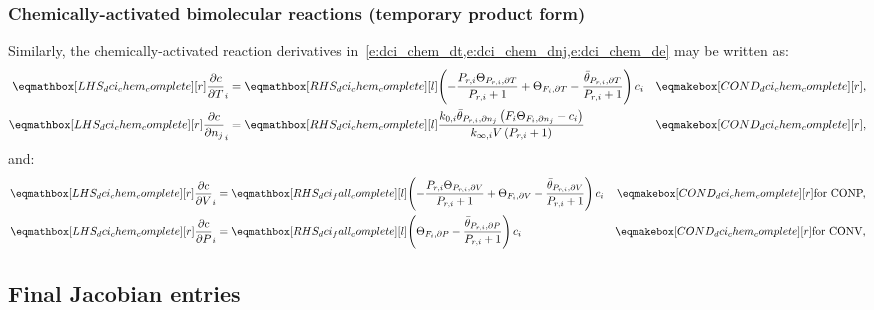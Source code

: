\documentclass[12pt]{article}
\newcommand{\conp}{CONP}
\newcommand{\conv}{CONV}
\newcommand{\dconp}{\ifmmode\text{for \conp,}\else for \conp,\fi}
\newcommand{\dconv}{\ifmmode\text{for \conv,}\else for \conv,\fi}
\begin{document}
\subsubsection{Chemically-activated bimolecular reactions (temporary product form)}
Similarly, the chemically-activated reaction derivatives in~\cref{e:dci_chem_dt,e:dci_chem_dnj,e:dci_chem_de} may be written as:
\begin{align}
\lhs{dci_chem_complete}{\frac{\partial c }{\partial T }_{i}} &= \rhs{dci_chem_complete}{\left(- \frac{P_{r, i} \Theta_{P_{r,i}, \partial T}}{P_{r, i} + 1} + \Theta_{F_i, \partial T} - \frac{\bar{\theta}_{P_{r, i}, \partial T}}{P_{r, i} + 1}\right) c_{i}} & \cond{dci_chem_complete}{,} \\
\lhs{dci_chem_complete}{\frac{\partial c }{\partial {n_j} }_{i}} &= \rhs{dci_chem_complete}{\frac{k_{0, i} \bar{\theta}_{P_{r, i}, \partial n_j} \left(F_{i} \Theta_{F_i, \partial n_j} - c_{i}\right)}{k_{\infty, i} V \left(P_{r, i} + 1\right)}} & \cond{dci_chem_complete}{,}
\end{align}
and:
\begin{subequations}
 \begin{align}
  \lhs{dci_chem_complete}{\frac{\partial c }{\partial V }_{i}} &= \rhs{dci_fall_complete}{\left(- \frac{P_{r, i} \Theta_{P_{r,i}, \partial V}}{P_{r, i} + 1} + \Theta_{F_i, \partial V} - \frac{\bar{\theta}_{P_{r, i}, \partial V}}{P_{r, i} + 1}\right) c_{i}} & \cond{dci_chem_complete}{\dconp} \\
  \lhs{dci_chem_complete}{\frac{\partial c }{\partial P }_{i}} &= \rhs{dci_fall_complete}{\left(\Theta_{F_i, \partial P} - \frac{\bar{\theta}_{P_{r, i}, \partial P}}{P_{r, i} + 1}\right) c_{i}} & \cond{dci_chem_complete}{\dconv}
 \end{align}
\end{subequations}


\subsection{Final Jacobian entries}
\label{s:jac_final}

\printbibliography
\end{document}
